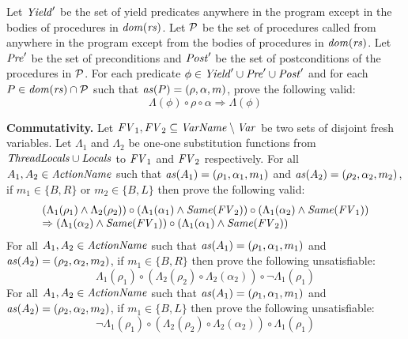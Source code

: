 Let $\mathit{Yield}'$ be the set of yield predicates anywhere in the program except in the bodies of procedures
in  $\mathit{dom}(\mathit{rs})$.
Let ${\cal P}$ be the set of procedures called from anywhere in the program except from the bodies of 
procedures in $\mathit{dom}(\mathit{rs})$.
Let $\mathit{Pre}'$ be the set of preconditions and $\mathit{Post}'$ be the set of postconditions of the procedures in ${\cal P}$.
For each predicate $\phi \in \mathit{Yield}' \cup \mathit{Pre}' \cup \mathit{Post}'$ and for each $P \in \mathit{dom}(\mathit{rs}) \cap {\cal P}$ such that
$\mathit{as}(P) = (\rho, \alpha, m)$, prove the following valid:
\[
\Lambda(\phi) \circ \rho \circ \alpha \Rightarrow \Lambda(\phi)
\]

{\bf Commutativity.}
Let $\mathit{FV}_1,\mathit{FV}_2 \subseteq \mathit{VarName} \setminus \mathit{Var}$ be two sets of disjoint fresh variables.
Let $\Lambda_1$ and $\Lambda_2$ be one-one 
substitution functions from $\mathit{ThreadLocals} \cup \mathit{Locals}$ to $\mathit{FV}_1$ and $\mathit{FV}_2$ respectively.
For all $A_1,A_2 \in \mathit{ActionName}$ such that $\mathit{as}(A_1) = (\rho_1,\alpha_1,m_1)$ and $\mathit{as}(A_2) = (\rho_2,\alpha_2,m_2)$,
if $m_1 \in \{B,R\}$ or $m_2 \in \{B,L\}$ then prove the following valid:
\[
\begin{array}{l}
(\Lambda_1(\rho_1) \wedge \Lambda_2(\rho_2)) \circ (\Lambda_1(\alpha_1) \wedge \mathit{Same}(\mathit{FV}_2)) \circ (\Lambda_1(\alpha_2) \wedge \mathit{Same}(\mathit{FV}_1)) \\ 
\Rightarrow (\Lambda_1(\alpha_2) \wedge \mathit{Same}(\mathit{FV}_1)) \circ (\Lambda_1(\alpha_1) \wedge \mathit{Same}(\mathit{FV}_2))
\end{array}
\]
For all $A_1,A_2 \in \mathit{ActionName}$ such that $\mathit{as}(A_1) = (\rho_1,\alpha_1,m_1)$ and $\mathit{as}(A_2) = (\rho_2,\alpha_2,m_2)$,
if $m_1 \in \{B,R\}$ then prove the following unsatisfiable:
\[
\Lambda_1(\rho_1) \circ (\Lambda_2(\rho_2) \circ \Lambda_2(\alpha_2)) \circ \neg \Lambda_1(\rho_1)
\]
For all $A_1,A_2 \in \mathit{ActionName}$ such that $\mathit{as}(A_1) = (\rho_1,\alpha_1,m_1)$ and $\mathit{as}(A_2) = (\rho_2,\alpha_2,m_2)$,
if $m_1 \in \{B,L\}$ then prove the following unsatisfiable:
\[
\neg \Lambda_1(\rho_1) \circ (\Lambda_2(\rho_2) \circ \Lambda_2(\alpha_2)) \circ \Lambda_1(\rho_1)
\]

